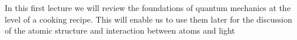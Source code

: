 In this first lecture we will review the foundations of quantum mechanics at the level of a cooking recipe. This will enable us to use them later for the discussion of the atomic structure and interaction between atoms and light